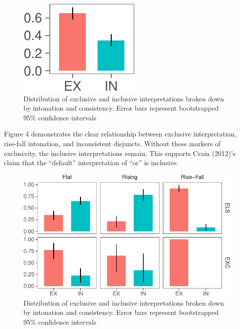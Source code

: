 \documentclass[10pt, letterpaper]{article}
\newenvironment{CodeChunk}{}{}
\begin{document}
\begin{CodeChunk}
\begin{figure}[tb]

{\centering \includegraphics{figs/interpretation-1} 

}

\caption[Distribution of exclusive and inclusive interpretations broken down by intonation and consistency]{Distribution of exclusive and inclusive interpretations broken down by intonation and consistency. Error bars represent bootstrapped 95\% confidence intervals}\label{fig:interpretation}
\end{figure}
\end{CodeChunk}

Figure 4 demonstrates the clear relationship between exclusive
interpretation, rise-fall intonation, and inconsistent disjuncts.
Without these markers of exclusivity, the inclusive interpretations
remain. This supports Crain (2012)'s claim that the ``default''
interpretation of ``or'' is inclusive.

\begin{CodeChunk}
\begin{figure}[h]

{\centering \includegraphics{figs/interpretationByIntonationAndConsistency-1} 

}

\caption[Distribution of exclusive and inclusive interpretations broken down by intonation and consistency]{Distribution of exclusive and inclusive interpretations broken down by intonation and consistency. Error bars represent bootstrapped 95\% confidence intervals}\label{fig:interpretationByIntonationAndConsistency}
\end{figure}
\end{CodeChunk}
\end{document}
